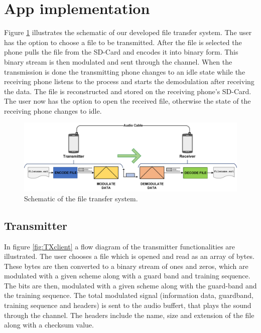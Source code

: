 \documentclass[12pt,a4paper,openright]{report}
\begin{document}
\section{App implementation} %

Figure \ref{fig:SchematicsSystem} illustrates the schematic of our developed file transfer system. The user has the option to choose a file to be transmitted. After the file is selected the phone pulls the file from the SD-Card and encodes it into binary form. This binary stream is then modulated and sent through the channel. When the transmission is done the transmitting phone changes to an idle state while the receiving phone listens to the process and starts the demodulation after receiving the data. The file is reconstructed and stored on the receiving phone's SD-Card. The user now has the option to open the received file, otherwise the state of the receiving phone changes to idle.

 \begin{figure}[H]
  \centering
    \includegraphics[width=1\textwidth]{FullSystem.png}
    \caption[Schematic of the file transfer system]{Schematic of the file transfer system.}
    \label{fig:SchematicsSystem}
\end{figure}


\clearpage
\subsection{Transmitter}

In figure \ref{fig:TXclient} a flow diagram of the transmitter functionalities are illustrated. The user chooses a file which is opened and read as an array of bytes. These bytes are then converted to a binary stream of ones and zeros, which are modulated with a given scheme along with a guard band and training sequence. The bits are then, modulated with a given scheme along with the guard-band and the training sequence. The total modulated signal (information data, guardband, training sequence and headers) is sent to the audio buffert, that plays the sound through the channel. The headers include the name, size and extension of the file along with a checksum value.
\end{document}
